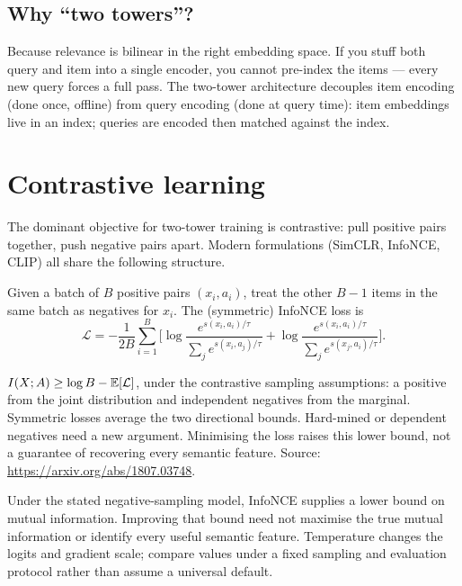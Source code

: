 \documentclass[11pt,oneside]{scrbook}
\begin{document}
\subsection{Why ``two towers''?}

Because relevance is bilinear in the right embedding space. If you stuff
both query and item into a single encoder, you cannot pre-index the items
--- every new query forces a full pass. The two-tower architecture
decouples item encoding (done once, offline) from query encoding (done
at query time): item embeddings live in an index; queries are encoded then
matched against the index.

\section{Contrastive learning}

The dominant objective for two-tower training is contrastive: pull positive
pairs together, push negative pairs apart. Modern formulations (SimCLR,
InfoNCE, CLIP) all share the following structure.

\begin{definition}
Given a batch of $B$ positive pairs $(x_i, a_i)$, treat the other $B-1$
items in the same batch as negatives for $x_i$. The (symmetric) InfoNCE
loss is
\[
\mathcal{L} = -\frac{1}{2B}\sum_{i=1}^B \Big[\log \frac{e^{s(x_i, a_i)/\tau}}{\sum_j e^{s(x_i, a_j)/\tau}}
+ \log \frac{e^{s(x_i, a_i)/\tau}}{\sum_j e^{s(x_j, a_i)/\tau}}\Big].
\]
\end{definition}

\begin{theorem}
$I(X;A)\ge\log B-\mathbb{E}[\mathcal L]$, under the contrastive sampling
assumptions: a positive from the joint distribution and independent negatives
from the marginal. Symmetric losses average the two directional bounds.
Hard-mined or dependent negatives need a new argument. Minimising the loss
raises this lower bound, not a guarantee of recovering every semantic feature.
Source: \url{https://arxiv.org/abs/1807.03748}.
\end{theorem}

\begin{intuition}
Under the stated negative-sampling model, InfoNCE supplies a lower bound
on mutual information. Improving that bound need not maximise the true
mutual information or identify every useful semantic feature. Temperature
changes the logits and gradient scale; compare values under a fixed
sampling and evaluation protocol rather than assume a universal default.
\end{intuition}
\end{document}
